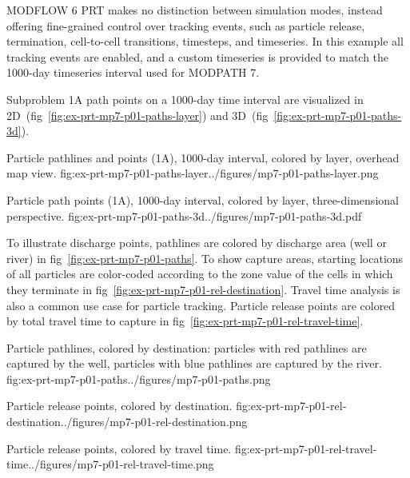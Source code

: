 MODFLOW 6 PRT makes no distinction between simulation modes, instead offering fine-grained control over tracking events, such as particle release, termination, cell-to-cell transitions, timesteps, and timeseries. In this example all tracking events are enabled, and a custom timeseries is provided to match the 1000-day timeseries interval used for MODPATH 7.

Subproblem 1A path points on a 1000-day time interval are visualized in 2D~(fig~\ref{fig:ex-prt-mp7-p01-paths-layer}) and 3D~(fig~\ref{fig:ex-prt-mp7-p01-paths-3d}).

\begin{StandardFigure}{
    Particle pathlines and points (1A), 1000-day interval, colored by layer, overhead map view.
    }{fig:ex-prt-mp7-p01-paths-layer}{../figures/mp7-p01-paths-layer.png}
\end{StandardFigure}

\begin{StandardFigure}{
    Particle path points (1A), 1000-day interval, colored by layer, three-dimensional perspective.
    }{fig:ex-prt-mp7-p01-paths-3d}{../figures/mp7-p01-paths-3d.pdf}
\end{StandardFigure}

To illustrate discharge points, pathlines are colored by discharge area (well or river) in fig~\ref{fig:ex-prt-mp7-p01-paths}. To show capture areas, starting locations of all particles are color-coded according to the zone value of the cells in which they terminate in fig~\ref{fig:ex-prt-mp7-p01-rel-destination}. Travel time analysis is also a common use case for particle tracking. Particle release points are colored by total travel time to capture in fig~\ref{fig:ex-prt-mp7-p01-rel-travel-time}.

\begin{StandardFigure}{
    Particle pathlines, colored by destination: particles with red pathlines are captured by the well, particles with blue pathlines are captured by the river.
    }{fig:ex-prt-mp7-p01-paths}{../figures/mp7-p01-paths.png}
\end{StandardFigure}

\begin{StandardFigure}{
    Particle release points, colored by destination.
    }{fig:ex-prt-mp7-p01-rel-destination}{../figures/mp7-p01-rel-destination.png}
\end{StandardFigure}

\begin{StandardFigure}{
    Particle release points, colored by travel time.
    }{fig:ex-prt-mp7-p01-rel-travel-time}{../figures/mp7-p01-rel-travel-time.png}
\end{StandardFigure}